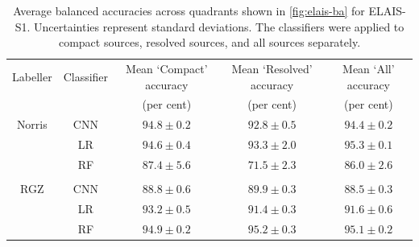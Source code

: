 \documentclass[fleqn,usenatbib,usedcolumn]{mnras}
\begin{document}
  \begin{table}
    \caption{Average balanced accuracies across quadrants shown in
      \autoref{fig:elais-ba} for ELAIS-S1. Uncertainties represent standard
      deviations. The classifiers were applied to compact sources, resolved
      sources, and all sources separately.}
    \label{tab:average-accuracies-elais}
    \begin{tabular}{ccccc}
      \hline
      Labeller & Classifier & Mean `Compact' accuracy & Mean `Resolved' accuracy & Mean `All' accuracy \\
       & & (per cent) & (per cent) & (per cent)\\
      \hline
      Norris & CNN & $94.8 \pm 0.2$ & $92.8 \pm 0.5$ & $94.4 \pm 0.2$ \\
       & LR & $94.6 \pm 0.4$ & $93.3 \pm 2.0$ & $95.3 \pm 0.1$ \\
       & RF & $87.4 \pm 5.6$ & $71.5 \pm 2.3$ & $86.0 \pm 2.6$ \\
       \\
      RGZ & CNN & $88.8 \pm 0.6$ & $89.9 \pm 0.3$ & $88.5 \pm 0.3$ \\
       & LR & $93.2 \pm 0.5$ & $91.4 \pm 0.3$ & $91.6 \pm 0.6$ \\
       & RF & $94.9 \pm 0.2$ & $95.2 \pm 0.3$ & $95.1 \pm 0.2$ \\
       \hline
    \end{tabular}
  \end{table}
\end{document}
